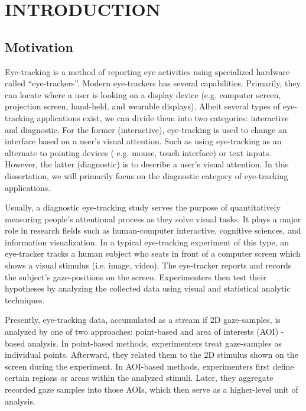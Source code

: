 \chapter{INTRODUCTION}
\label{chap:Intro}

\section{Motivation}
\label{sec:Motivation}
Eye-tracking is a method of reporting eye activities using specialized hardware called ``eye-trackers''. Modern eye-trackers has several capabilities. Primarily, they can locate where a user is looking on a display device (e.g. computer screen, projection screen, hand-held, and wearable displays). Albeit several types of eye-tracking applications exist, we can divide them into two categories: interactive and diagnostic. For the former (interactive), eye-tracking is used to change an interface based on a user's visual attention. Such as using eye-tracking as an alternate to pointing devices ( e.g. mouse, touch interface) or text inputs. However, the latter  (diagnostic) is to describe a user's visual attention. In this dissertation, we will primarily focus on the diagnostic category of eye-tracking applications. 

Usually, a diagnostic eye-tracking study serves the purpose of quantitatively measuring people's attentional process as they solve visual tasks. It plays a major role in research fields such as human-computer interactive, cognitive sciences, and information visualization. In a typical eye-tracking experiment of this type, an eye-tracker tracks a human subject who seats in front of a computer screen which shows a visual stimulus (i.e. image, video). The eye-tracker reports and records the subject's gaze-positions on the screen. Experimenters then test their hypotheses by analyzing the collected data using visual and statistical analytic techniques. 

Presently, eye-tracking data, accumulated as a stream if 2D gaze-samples, is analyzed by one of two approaches: point-based and area of interests (AOI) -based analysis. In point-based methods, experimenters treat gaze-samples as individual points. Afterward, they related them to the 2D stimulus shown on the screen during the experiment. In AOI-based methods, experimenters first define certain regions or areas within the analyzed stimuli. Later, they aggregate recorded gaze samples into those AOIs, which then serve as a higher-level unit of analysis.

